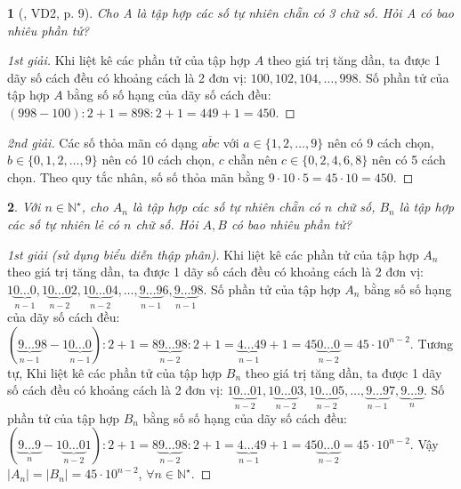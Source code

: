 \documentclass{article}
\newtheorem{baitoan}{}
\begin{document}
\begin{baitoan}[\cite{Binh_boi_duong_Toan_6_tap_1}, VD2, p. 9]
	Cho A là tập hợp các số tự nhiên chẵn có 3 chữ số. Hỏi A có bao nhiêu phần tử?
\end{baitoan}

\begin{proof}[1st giải]
	Khi liệt kê các phần tử của tập hợp $A$ theo giá trị tăng dần, ta được 1 dãy số cách đều có khoảng cách là 2 đơn vị: $100,102,104,\ldots,998$. Số phần tử của tập hợp $A$ bằng số số hạng của dãy số cách đều: $(998 - 100):2 + 1 = 898:2 + 1 = 449 + 1 = 450$.
\end{proof}

\begin{proof}[2nd giải]
	Các số thỏa mãn có dạng $\overline{abc}$ với $a\in\{1,2,\ldots,9\}$ nên có 9 cách chọn, $b\in\{0,1,2,\ldots,9\}$ nên có 10 cách chọn, $c$ chẵn nên $c\in\{0,2,4,6,8\}$ nên có 5 cách chọn. Theo quy tắc nhân, số số thỏa mãn bằng $9\cdot10\cdot5 = 45\cdot10 = 450$.
\end{proof}

\begin{baitoan}
	Với $n\in\mathbb{N}^\star$, cho $A_n$ là tập hợp các số tự nhiên chẵn có $n$ chữ số, $B_n$ là tập hợp các số tự nhiên lẻ có $n$ chữ số. Hỏi $A,B$ có bao nhiêu phần tử?
\end{baitoan}

\begin{proof}[1st giải (sử dụng biểu diễn thập phân)]
	Khi liệt kê các phần tử của tập hợp $A_n$ theo giá trị tăng dần, ta được 1 dãy số cách đều có khoảng cách là 2 đơn vị: $1\underbrace{0\ldots0}_{n-1},1\underbrace{0\ldots0}_{n-2}2,1\underbrace{0\ldots0}_{n-2}4,\ldots,\underbrace{9\ldots9}_{n-1}6,\underbrace{9\ldots9}_{n-1}8$. Số phần tử của tập hợp $A_n$ bằng số số hạng của dãy số cách đều: $(\underbrace{9\ldots9}_{n-1}8 - 1\underbrace{0\ldots0}_{n-1}):2 + 1 = 8\underbrace{9\ldots9}_{n-2}8:2 + 1 = \underbrace{4\ldots4}_{n-1}9 + 1 = 45\underbrace{0\ldots0}_{n-2} = 45\cdot10^{n-2}$. Tương tự, Khi liệt kê các phần tử của tập hợp $B_n$ theo giá trị tăng dần, ta được 1 dãy số cách đều có khoảng cách là 2 đơn vị: $1\underbrace{0\ldots0}_{n-2}1,1\underbrace{0\ldots0}_{n-2}3,1\underbrace{0\ldots0}_{n-2}5,\ldots,\underbrace{9\ldots9}_{n-1}7,\underbrace{9\ldots9}_n$. Số phần tử của tập hợp $B_n$ bằng số số hạng của dãy số cách đều: $(\underbrace{9\ldots9}_n - 1\underbrace{0\ldots0}_{n-2}1):2 + 1 = 8\underbrace{9\ldots9}_{n-2}8:2 + 1 = \underbrace{4\ldots4}_{n-1}9 + 1 = 45\underbrace{0\ldots0}_{n-2} = 45\cdot10^{n-2}$. Vậy $|A_n| = |B_n| = 45\cdot10^{n-2}$, $\forall n\in\mathbb{N}^\star$.
\end{proof}
\end{document}

